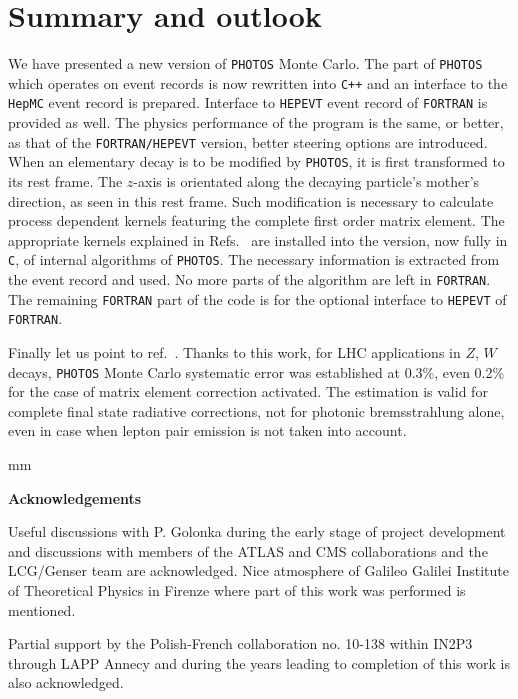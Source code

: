 \documentclass[]{Photos_interface_design}
\begin{document}
\section{Summary and outlook}
\label{sec:summary}
We have presented a new version  of {\tt PHOTOS} Monte Carlo. The part of 
{\tt PHOTOS} which operates on 
event records is now rewritten into {\tt C++} and an interface to the {\tt HepMC} event record 
is prepared. Interface to {\tt HEPEVT} event record of {\tt FORTRAN} is provided as well.
The physics performance of the program is the
same, or better,  as that of the {\tt FORTRAN/HEPEVT} version, better steering options are introduced. 
When an elementary decay is to be modified by {\tt PHOTOS}, 
it is first transformed to its rest frame. The $z$-axis is orientated along the decaying particle's mother's direction, 
as seen in this rest  frame. Such modification is 
necessary to calculate process dependent kernels
featuring the complete first order matrix element. 
The appropriate kernels explained in
Refs.~\cite{Golonka:2006tw,Nanava:2006vv,Nanava:2009vg} are installed
into the version, now fully in {\tt C}, of internal algorithms of {\tt PHOTOS}. The necessary information is extracted
from the event record and  used.
No more  parts of the algorithm are left in {\tt FORTRAN}.
 The remaining {\tt FORTRAN} part of the code is for the optional interface to {\tt HEPEVT} of {\tt FORTRAN}. 


{Finally let us point to ref.~\cite{Arbuzov:2012dx}. Thanks to this work, for LHC applications in $Z$, $W$ decays,
{\tt PHOTOS} Monte Carlo systematic error was established at  0.3\%, even   0.2\% for the case of matrix element correction activated. The estimation is valid
for complete final state radiative corrections, not for photonic bremsstrahlung
alone, even in case when lepton pair emission is not taken into account.
}

 mm

\centerline{\large\bf Acknowledgements}


Useful discussions with P. Golonka during the early stage of project development and discussions 
with members of the ATLAS and CMS collaborations and the LCG/Genser team 
are acknowledged.
Nice atmosphere of Galileo Galilei Institute of Theoretical Physics  in Firenze where part of this 
work was performed is mentioned. 

Partial support by the Polish-French collaboration
no. 10-138 within IN2P3 through LAPP Annecy and 
during the years leading to  completion of this work is
also acknowledged.
\end{document}

